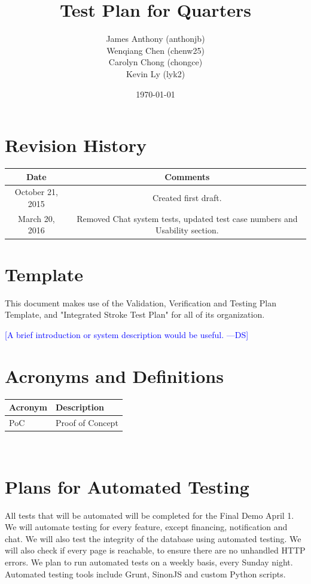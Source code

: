 \documentclass[12pt]{article}
\newcommand{\authornote}[3]{\textcolor{#1}{[#3 ---#2]}}
\newcommand{\authornote}[3]{}
\newcommand{\ds}[1]{\authornote{blue}{DS}{#1}}
\begin{document}
\title{Test Plan for Quarters} 
\author{James Anthony (anthonjb)\\ Wenqiang Chen (chenw25)\\ Carolyn Chong 
(chongce)\\ Kevin Ly (lyk2)}
\date{\today}
  
\maketitle

\pagebreak

\tableofcontents

\section*{Revision History}
\begin{tabular}{|c|c|}
\hline
\textbf{Date}  & \textbf{Comments} \\ \hline
October 21, 2015 & Created first draft. \\ 
\hline
March 20, 2016 & Removed Chat system tests, updated test case numbers and Usability section. \\ 
\hline
\end{tabular}

\section*{Template}
This document makes use of the Validation, Verification and Testing Plan Template, and "Integrated Stroke Test Plan" for all of its organization.

\ds{A brief introduction or system description would be useful.}

\pagebreak


\section{Acronyms and Definitions}
\renewcommand{\arraystretch}{1.2}
\begin{tabular}{l l} 
  \toprule    
  \textbf{Acronym} & \textbf{Description}\\
  \midrule 
  PoC   &Proof of Concept\\
  \bottomrule
\end{tabular}\\


\section{Plans for Automated Testing}
All tests that will be automated will be completed for the Final Demo April 1. We will automate testing for every feature, except financing, notification and chat. We will also test the integrity of the database using automated testing. We will also check if every page is reachable, to ensure there are no unhandled HTTP errors. We plan to run automated tests on a weekly basis, every Sunday night. Automated testing tools include Grunt, SinonJS and custom Python scripts. 
\end{document}
